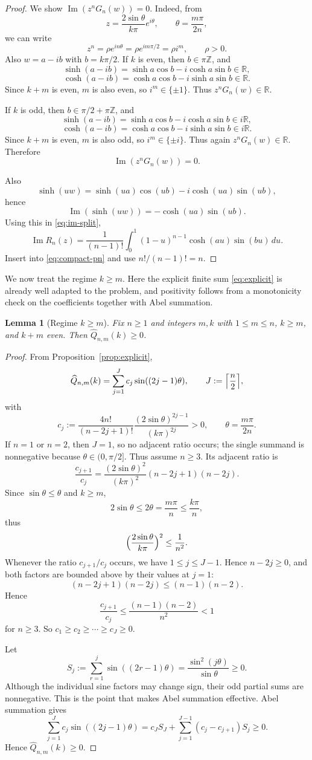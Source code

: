 \documentclass[10pt,a4paper]{amsart}
\newtheorem{lemma}[theorem]{Lemma}
\newcommand{\bbR}{\mathbb R}
\newcommand{\bbZ}{\mathbb Z}
\DeclareMathOperator{\ImagPart}{Im}
\renewcommand{\Im}{\ImagPart}
\begin{document}
\begin{proof}
We show $\Im(z^nG_n(w))=0$. Indeed, from
\[ 
z=\frac{2\sin\theta}{k\pi}e^{i\theta}, \qquad \theta=\frac{m\pi}{2n}, 
\]
we can write 
\[ 
z^n=\rho e^{in\theta}=\rho e^{im\pi/2}=\rho i^m, \qquad \rho>0. 
\]
Also $w=a-ib$ with $b=k\pi/2$. If $k$ is even, then $b\in\pi\bbZ$, and
\[ \sinh(a-ib)= \sinh a\cos b-i\cosh a\sin b\in\bbR, \]
\[ \cosh(a-ib)= \cosh a\cos b-i\sinh a\sin b\in\bbR. \]
Since $k+m$ is even, $m$ is also even, so $i^m\in\{\pm1\}$. Thus $z^nG_n(w)\in\bbR$.

If $k$ is odd, then $b\in\pi/2+\pi\bbZ$, and 
\[ \sinh(a-ib)=\sinh a\cos b-i\cosh a\sin b\in i\bbR, \] 
\[ \cosh(a-ib)=\cosh a\cos b-i\sinh a\sin b\in i\bbR. \]
Since $k+m$ is even, $m$ is also odd, so $i^m\in\{\pm i\}$. Thus again $z^nG_n(w)\in\bbR$. Therefore \[ \Im(z^nG_n(w))=0. \]

Also
\[
\sinh(uw)=\sinh(ua)\cos(ub)-i\cosh(ua)\sin(ub),
\]
hence
\[
\Im(\sinh(uw))=-\cosh(ua)\sin(ub).
\]
Using this in \eqref{eq:im-split},
\[
\Im R_n(z)=\frac{1}{(n-1)!}\int_0^1(1-u)^{n-1}\cosh(au)\sin(bu)\,du.
\]
Insert into \eqref{eq:compact-pn} and use $n!/(n-1)!=n$.
\end{proof}


We now treat the regime $k \ge m$. Here the explicit finite sum \eqref{eq:explicit} is already well adapted to the problem, and positivity follows from a monotonicity check on the coefficients together with Abel summation.

\begin{lemma}[Regime $k\ge m$]\label{lem:k-ge-m}
Fix $n\ge1$ and integers $m,k$ with $1\le m\le n$, $k\ge m$, and $k+m$ even.
Then $\widehat Q_{n,m}(k)\ge0$.
\end{lemma}

\begin{proof}
From Proposition~\ref{prop:explicit},
\[
\widehat Q_{n,m}(k)=\sum_{j=1}^{J} c_j\sin((2j-1)\theta),
\qquad
J:=\Bigl\lceil\frac n2\Bigr\rceil,
\]
with
\[
c_j:=\frac{4n!}{(n-2j+1)!}\frac{(2\sin\theta)^{2j-1}}{(k\pi)^{2j}}>0,
\qquad
\theta=\frac{m\pi}{2n}.
\]
If $n=1$ or $n=2$, then $J=1$, so no adjacent ratio occurs; the single summand is nonnegative because $\theta\in(0,\pi/2]$. Thus assume $n\ge3$. Its adjacent ratio is
\[
\frac{c_{j+1}}{c_j}
=\frac{(2\sin\theta)^2}{(k\pi)^2}(n-2j+1)(n-2j).
\]
Since $\sin\theta\le\theta$ and $k\ge m$,
\[
2\sin\theta\le 2\theta=\frac{m\pi}{n}\le\frac{k\pi}{n},
\]
thus 
\[ 
\Bigl(\frac{2\sin\theta}{k\pi}\Bigr)^2\le\frac1{n^2}. 
\]
Whenever the ratio $c_{j+1}/c_j$ occurs, we have  $1\le j\le J-1$. Hence $n-2j\ge0$, and both factors are bounded above by their values at $j=1$:
\[ 
(n-2j+1)(n-2j)\le (n-1)(n-2). 
\] 
Hence 
\[ 
\frac{c_{j+1}}{c_j} \le \frac{(n-1)(n-2)}{n^2}<1 
\] 
for $n \ge 3$. So $c_1\ge c_2\ge\cdots\ge c_J\ge0$.

Let
\[
S_j:=\sum_{r=1}^j \sin((2r-1)\theta)
=\frac{\sin^2(j\theta)}{\sin\theta}\ge0.
\]
Although the individual sine factors may change sign, their odd partial sums are nonnegative. This is the point that makes Abel summation effective. Abel summation gives
\[
\sum_{j=1}^{J} c_j\sin((2j-1)\theta)
=c_JS_J+\sum_{j=1}^{J-1}(c_j-c_{j+1})S_j\ge0.
\]
Hence $\widehat Q_{n,m}(k)\ge0$.
\end{proof}
\end{document}
